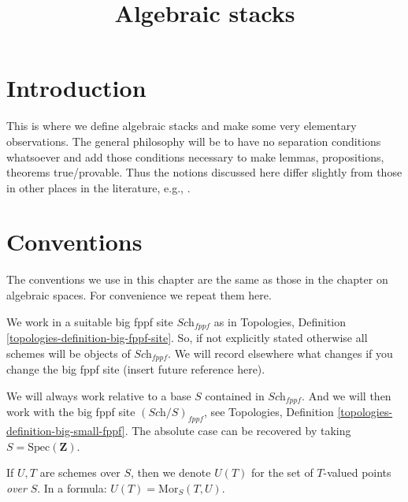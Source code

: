 

%


\title{Algebraic stacks}


\maketitle

\label{section-phantom}

\tableofcontents

\section{Introduction}
\label{section-introduction}

\noindent
This is where we define algebraic stacks and make some very elementary
observations. The general philosophy will be to have no separation
conditions whatsoever and add those conditions necessary to make lemmas,
propositions, theorems true/provable. Thus the notions discussed here
differ slightly from those in other places in the literature, e.g.,
\cite{LM-B}.



\section{Conventions}
\label{section-conventions}

\noindent
The conventions we use in this chapter are the same as those in the
chapter on algebraic spaces. For convenience we repeat them here.

\medskip\noindent
We work in a suitable big fppf site $\textit{Sch}_{fppf}$
as in Topologies, Definition \ref{topologies-definition-big-fppf-site}.
So, if not explicitly stated otherwise all schemes will be objects
of $\textit{Sch}_{fppf}$.
We will record elsewhere what changes if you change the big
fppf site (insert future reference here).

\medskip\noindent
We will always work relative to a base $S$ contained in $\textit{Sch}_{fppf}$.
And we will then work with the big fppf site $(\textit{Sch}/S)_{fppf}$,
see Topologies, Definition \ref{topologies-definition-big-small-fppf}.
The absolute case can be recovered by taking
$S = \text{Spec}(\mathbf{Z})$.

\medskip\noindent
If $U, T$ are schemes over $S$, then we denote
$U(T)$ for the set of $T$-valued points {\it over} $S$.
In a formula: $U(T) = \text{Mor}_S(T, U)$.

